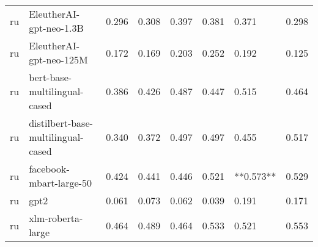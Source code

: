 \begin{tabular}{llllllll}
      ru &            EleutherAI-gpt-neo-1.3B & 0.296 &                     0.308 &                 0.397 &                  0.381 &                                   0.371 &     0.298 \\
      ru &            EleutherAI-gpt-neo-125M & 0.172 &                     0.169 &                 0.203 &                  0.252 &                                   0.192 &     0.125 \\
      ru &       bert-base-multilingual-cased & 0.386 &                     0.426 &                 0.487 &                  0.447 &                                   0.515 &     0.464 \\
      ru & distilbert-base-multilingual-cased & 0.340 &                     0.372 &                 0.497 &                  0.497 &                                   0.455 &     0.517 \\
      ru &            facebook-mbart-large-50 & 0.424 &                     0.441 &                 0.446 &                  0.521 &                               **0.573** &     0.529 \\
      ru &                               gpt2 & 0.061 &                     0.073 &                 0.062 &                  0.039 &                                   0.191 &     0.171 \\
      ru &                  xlm-roberta-large & 0.464 &                     0.489 &                 0.464 &                  0.533 &                                   0.521 &     0.553 \\
\bottomrule
\end{tabular}
